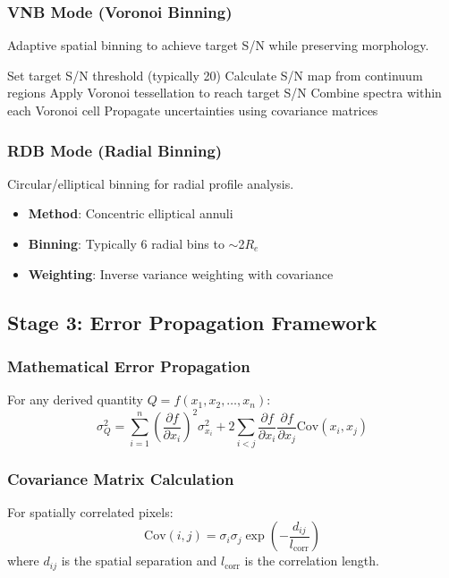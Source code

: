 \documentclass[12pt,a4paper]{article}
\begin{document}
\subsubsection{VNB Mode (Voronoi Binning)}
Adaptive spatial binning to achieve target S/N while preserving morphology.
\begin{algorithm}
\caption{Voronoi Binning Algorithm}
\begin{algorithmic}[1]
\STATE Set target S/N threshold (typically 20)
\STATE Calculate S/N map from continuum regions
\STATE Apply Voronoi tessellation to reach target S/N
\STATE Combine spectra within each Voronoi cell
\STATE Propagate uncertainties using covariance matrices
\end{algorithmic}
\end{algorithm}

\subsubsection{RDB Mode (Radial Binning)}
Circular/elliptical binning for radial profile analysis.
\begin{itemize}
    \item \textbf{Method}: Concentric elliptical annuli
    \item \textbf{Binning}: Typically 6 radial bins to $\sim$2$R_e$
    \item \textbf{Weighting}: Inverse variance weighting with covariance
\end{itemize}

\subsection{Stage 3: Error Propagation Framework}

\subsubsection{Mathematical Error Propagation}
For any derived quantity $Q = f(x_1, x_2, \ldots, x_n)$:
\begin{equation}
\sigma_Q^2 = \sum_{i=1}^n \left(\frac{\partial f}{\partial x_i}\right)^2 \sigma_{x_i}^2 + 2\sum_{i<j} \frac{\partial f}{\partial x_i} \frac{\partial f}{\partial x_j} \text{Cov}(x_i, x_j)
\end{equation}

\subsubsection{Covariance Matrix Calculation}
For spatially correlated pixels:
\begin{equation}
\text{Cov}(i,j) = \sigma_i \sigma_j \exp\left(-\frac{d_{ij}}{l_{\text{corr}}}\right)
\end{equation}
where $d_{ij}$ is the spatial separation and $l_{\text{corr}}$ is the correlation length.
\end{document}
